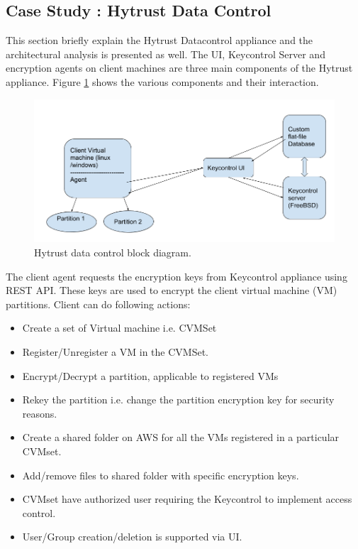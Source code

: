 \documentclass[conference]{IEEEtran}
\begin{document}
\subsection{Case Study : Hytrust Data Control}
This section briefly explain the Hytrust Datacontrol \cite{hytrust} appliance and the architectural analysis is presented as well.
The UI, Keycontrol Server and encryption agents on client machines are three main components of the Hytrust appliance. Figure \ref{hytrustBlockDiagram} shows the various components and their interaction.
\begin{figure}[htbp]
\centerline{\includegraphics[scale=0.3]{HytrustAppliance.png}}
\caption{Hytrust data control block diagram.}
\label{hytrustBlockDiagram}
\end{figure}

The client agent requests the encryption keys from Keycontrol appliance using REST API. These keys are used to encrypt the client virtual machine (VM) partitions.
Client can do following actions:
\begin{itemize}
\item Create a set of Virtual machine i.e. CVMSet
\item Register/Unregister a VM in the CVMSet.
\item Encrypt/Decrypt a partition, applicable to registered VMs
\item Rekey the partition i.e. change the partition encryption key for security reasons.
\item Create a shared folder on AWS for all the VMs registered in a particular CVMset.
\item Add/remove files to shared folder with specific encryption keys.
\item CVMset have authorized user requiring the Keycontrol to implement access control.
\item User/Group creation/deletion is supported via UI.
\end{itemize}
\end{document}
